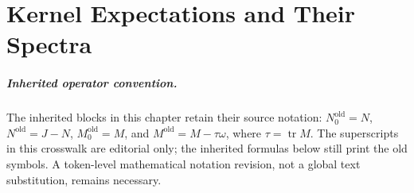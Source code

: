 \chapter{Kernel Expectations and Their Spectra}
\label{organized:operators}
\label{chaptersix}

\paragraph{Inherited operator convention.}
The inherited blocks in this chapter retain their source notation:
$N_0^{\mathrm{old}}=N$,
$N^{\mathrm{old}}=J-N$,
$M_0^{\mathrm{old}}=M$, and
$M^{\mathrm{old}}=M-\tau\omega$, where $\tau=\operatorname{tr}M$.
The superscripts in this crosswalk are editorial only; the inherited
formulas below still print the old symbols. A token-level mathematical
notation revision, not a global text substitution, remains necessary.






